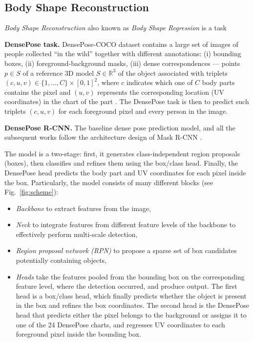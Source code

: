 \subsection{Body Shape Reconstruction}

\textit{Body Shape Reconstruction} also known as \textit{Body Shape Regression} is a task 

\noindent 
\textbf{DensePose task.} DensePose-COCO dataset contains a large set of images of people collected ``in the wild'' together with different annotations: (i) bounding boxes, (ii) foreground-background masks, (iii) dense correspondences --- points $p \in S$ of a reference 3D model $S\in\mathbb{R}^3$ of the object associated with triplets $(c, u, v) \in\{1, \ldots, C\} \times[0,1]^{2}$, where $c$ indicates which one of $C$ body parts contains the pixel and $(u,v)$ represents the corresponding location (UV coordinates) in the chart of the part \cite{smpl}.
The DensePose task is then to predict such triplets $(c, u, v)$ for each foreground pixel and every person in the image.
\newline

\noindent \textbf{DensePose R-CNN.} The baseline dense pose prediction model, and all the subsequent works \cite{parsing, uncertainty, monkeys} follow the architecture design of Mask R-CNN \cite{maskrcnn}.

The model is a two-stage: first, it generates class-independent region proposals (boxes), then classifies and refines them using the box/class head. Finally, the DensePose head predicts the body part and UV coordinates for each pixel inside the box. Particularly, the model consists of many different blocks (see Fig.~\ref{fig:scheme}):
\begin{itemize}
    \item \textit{Backbone} to extract features from the image,
    \item \textit{Neck} to integrate features from different feature levels of the backbone to effectively perform multi-scale detection,
    \item \textit{Region proposal network (RPN)} to propose a sparse set of box candidates potentially containing objects,
    \item \textit{Heads} take the features pooled from the bounding box on the corresponding feature level, where the detection occurred, and produce output. The first head is a box/class head, which finally predicts whether the object is present in the box and refines the box coordinates. The second head is the DensePose head that predicts either the pixel belongs to the background or assigns it to one of the 24 DensePose charts, and regresses UV coordinates to each foreground pixel inside the bounding box.
\end{itemize}

